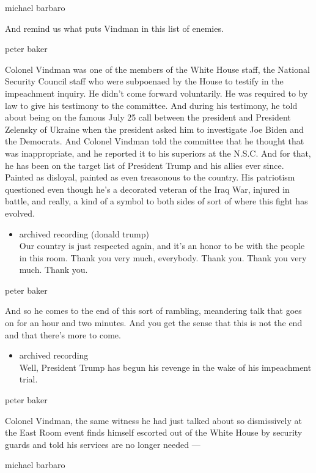 michael barbaro

And remind us what puts Vindman in this list of enemies.

peter baker

Colonel Vindman was one of the members of the White House staff, the
National Security Council staff who were subpoenaed by the House to
testify in the impeachment inquiry. He didn't come forward voluntarily.
He was required to by law to give his testimony to the committee. And
during his testimony, he told about being on the famous July 25 call
between the president and President Zelensky of Ukraine when the
president asked him to investigate Joe Biden and the Democrats. And
Colonel Vindman told the committee that he thought that was
inappropriate, and he reported it to his superiors at the N.S.C. And for
that, he has been on the target list of President Trump and his allies
ever since. Painted as disloyal, painted as even treasonous to the
country. His patriotism questioned even though he's a decorated veteran
of the Iraq War, injured in battle, and really, a kind of a symbol to
both sides of sort of where this fight has evolved.

\begin{itemize}
\tightlist
\item
  archived recording (donald trump)\\
  Our country is just respected again, and it's an honor to be with the
  people in this room. Thank you very much, everybody. Thank you. Thank
  you very much. Thank you.
\end{itemize}

peter baker

And so he comes to the end of this sort of rambling, meandering talk
that goes on for an hour and two minutes. And you get the sense that
this is not the end and that there's more to come.

\begin{itemize}
\tightlist
\item
  archived recording\\
  Well, President Trump has begun his revenge in the wake of his
  impeachment trial.
\end{itemize}

peter baker

Colonel Vindman, the same witness he had just talked about so
dismissively at the East Room event finds himself escorted out of the
White House by security guards and told his services are no longer
needed ---

michael barbaro

